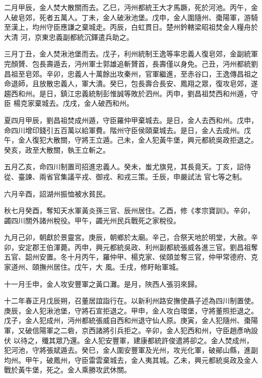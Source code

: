 \begin{pinyinscope}
 二月甲辰，金人焚大散關而去。乙巳，沔州都統王大才馬蹶，死於河池。丙午，金人破皂郊，死者五萬人。丁未，金人破湫池堡。戊申，金人圍隨州、棗陽軍，游騎至漢上，均州守臣應謙之棄城走。丙辰，白虹貫日。楚州鈐轄梁昭祖焚金人糧舟於大清
 河，京東忠義副都統沉鐸遣兵助之。



 三月丁丑，金人焚湫池堡而去。戊子，利州統制王逸等率忠義人復皂郊，金副統軍完顏贇、包長壽遁去，沔州軍士郭雄追斬贇首，長壽僅以身免。己丑，沔州都統劉昌祖至皂郊。辛卯，忠義人十萬餘出攻秦州，官軍繼進，至赤谷口，王逸傳昌祖之命退師，且放散忠義人，軍大潰。癸巳，包長壽合長安、鳳翔之眾，復攻皂郊，遂趨西和州。是日，鎮江忠義統制彭惟誠等敗於泗州。丙申，劉昌祖焚西和州遁，守臣
 楊克家棄城去。戊戌，金人破西和州。



 夏四月甲辰，劉昌祖焚成州遁，守臣羅仲甲棄城去。是日，金人去西和州。戊申，命四川增印錢引五百萬以給軍費。階州守臣侯頤棄城去。是日，金人去成州。戊午，金人復犯大散關，守將王立遁。己未，金人犯黃牛堡，興元都統吳政拒退之。癸亥，政至大散關，執王立斬之。



 五月乙亥，命四川制置司招進忠義人。癸未，蚩尤旗見，其長竟天。丁亥，詔侍從、臺諫、兩省官集議平戎、御戎、和戎三策。壬辰，申嚴試法
 官七等之制。



 六月辛酉，詔湖州振恤被水貧民。



 秋七月癸酉，奪知天水軍黃炎孫三官、辰州居住。乙酉，修《孝宗寶訓》。辛卯，蠲四川關外諸州稅役。甲午，蠲光州民兵戰死之家稅役。



 九月己卯，朝獻於景靈宮。庚辰，朝鄉於太廟。辛己，合祭天地於明堂，大赦。辛卯，安定郡王伯渾薨。丙申，興元都統吳政、利州副都統張威各進三官。劉昌祖奪五官、韶州安置。冬十月丙午，羅仲甲、楊克家、侯頤並奪三官，仲甲常德府、克家道州、頤撫州居住。戊午，大
 風。壬戌，修盱眙軍城。



 十一月壬申，金人攻安豐軍之黃口灘。是月，陜西人張羽來歸。



 十二年春正月戊辰朔，召董居誼詣行在。以新利州路安撫使聶子述為四川制置使。庚辰，金人犯湫池堡，守將石宣拒退之。甲申，金人攻白環堡，守將董照拒退之。戊子，金人犯成州，沔州都統張威自西和州退守仙人原。庚寅，金人犯隨州、棗陽軍，又破信陽軍之二砦，京西諸將引兵拒之。辛卯，金人犯西和州，守臣趙彥吶設伏
 以待之，殲其眾乃還。金人犯安豐軍，建康都統許俊遣將卻之。金人焚成州，犯河池，守將張斌遁去。癸巳，金人圍安豐軍及光州，攻光化軍，破鄖山縣，進副均州。甲午，破鳳州，守臣雷雲棄城去，金人夷其城。乙未，興元都統吳政及金人戰於黃牛堡，死之。金人乘勝攻武休關。




\end{pinyinscope}
